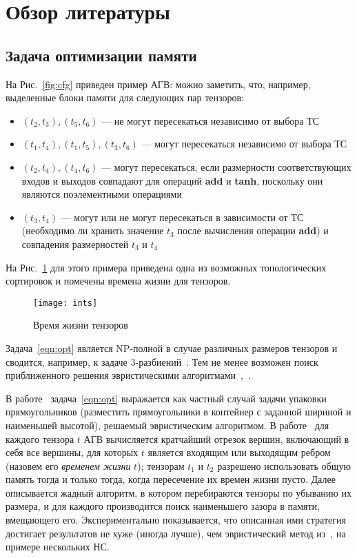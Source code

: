 
\section{Обзор литературы}\label{sec:literature}
\subsection{Задача оптимизации памяти}

На Рис.~\ref{fig:cfg} приведен пример АГВ: можно заметить, что, например,
выделенные блоки памяти для следующих пар тензоров:
\begin{itemize}[nosep]
    \item $(t_2,t_3),(t_5,t_6)$ — не могут пересекаться независимо от выбора ТС
    \item $(t_1,t_4),(t_1,t_5),(t_3,t_6)$ — могут пересекаться независимо от
    выбора ТС
    \item $(t_2,t_4),(t_4,t_6)$ — могут пересекаться, если размерности
    соответствующих входов и выходов совпадают для операций \textbf{add} и
    \textbf{tanh}, поскольку они являются поэлементными операциями
    \item $(t_3,t_4)$ — могут или не могут пересекаться в зависимости от ТС
    (необходимо ли хранить значение $t_3$ после вычисления операции
    \textbf{add}) и совпадения размерностей $t_3$ и $t_4$
\end{itemize}
На Рис.~\ref{fig:ints} для этого примера приведена одна из возможных
топологических сортировок и помечены времена жизни для тензоров.

\begin{figure}[ht]
\centering
\texttt{[image: ints]}
\caption{Время жизни тензоров}
\label{fig:ints}
\end{figure}


Задача~\ref{eqn:opt} является NP-полной в случае различных размеров тензоров и
сводится, например, к задаче 3-разбиений~\cite{np_complete}. Тем не менее
возможен поиск приближенного решения эвристическими
алгоритмами~\cite{sekiyama2018profile},~\cite{pisarchyk2020efficient}.

В работе~\cite{sekiyama2018profile} задача~\ref{eqn:opt} выражается как частный
случай задачи упаковки прямоугольников (разместить прямоугольники в контейнер с
заданной шириной и наименьшей высотой), решаемый эвристическим алгоритмом. В
работе~\cite{pisarchyk2020efficient} для каждого тензора $t$ АГВ вычисляется
кратчайший отрезок вершин, включающий в себя все вершины, для которых $t$
является входящим или выходящим ребром (назовем его \textit{временем жизни}
$t$); тензорам $t_1$ и $t_2$ разрешено использовать общую память тогда и только
тогда, когда пересечение их времен жизни пусто. Далее описывается жадный
алгоритм, в котором перебираются тензоры по убыванию их размера, и для каждого
производится поиск наименьшего зазора в памяти, вмещающего его. Экспериментально
показывается, что описанная ими стратегия достигает результатов не хуже (иногда
лучше), чем эвристический метод из~\cite{sekiyama2018profile}, на примере
нескольких НС.

